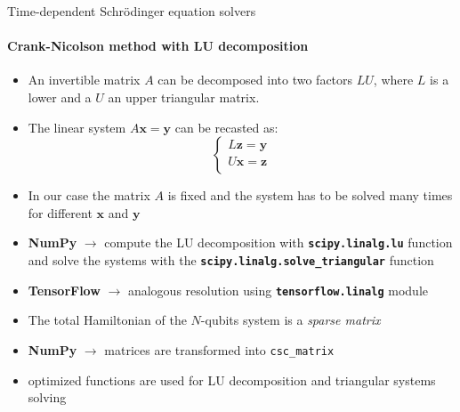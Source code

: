 \documentclass[8pt]{beamer}
\begin{document}
\begin{frame}[c]{Time-dependent Schr{\"o}dinger equation solvers
}
\framesubtitle{Crank-Nicolson method with LU decomposition}

\begin{itemize}
    \item An invertible matrix $A$ can be decomposed into two factors $LU$, where $L$ is a lower and a $U$ an upper triangular matrix.
    \item The linear system $A\boldsymbol{x} = \boldsymbol{y}$ can be recasted as: 
    \begin{equation*}
    \begin{cases}
        L\boldsymbol{z} = \boldsymbol{y} \\
        U\boldsymbol{x} = \boldsymbol{z} \\
    \end{cases}
    \end{equation*}
    \item In our case the matrix $A$ is fixed and the system has to be solved many times for different $\boldsymbol{x}$ and $\boldsymbol{y}$
    \vspace{0.5cm}
    \item \textbf{NumPy} $\rightarrow$ compute the LU decomposition with {\bfseries\texttt{scipy.linalg.lu}} function and solve the systems with the {\bfseries\texttt{scipy.linalg.solve\_triangular}} function
    \item \textbf{TensorFlow} $\rightarrow$ analogous resolution using {\bfseries\texttt{tensorflow.linalg}} module
    \vspace{0.5cm}
    \item The total Hamiltonian of the $N$-qubits system is a \textit{sparse matrix}
    \item \textbf{NumPy} $\rightarrow$ matrices are transformed into \texttt{csc\_matrix}
    \item optimized functions are used for LU decomposition and triangular systems solving
\end{itemize}
\end{frame}
\end{document}
